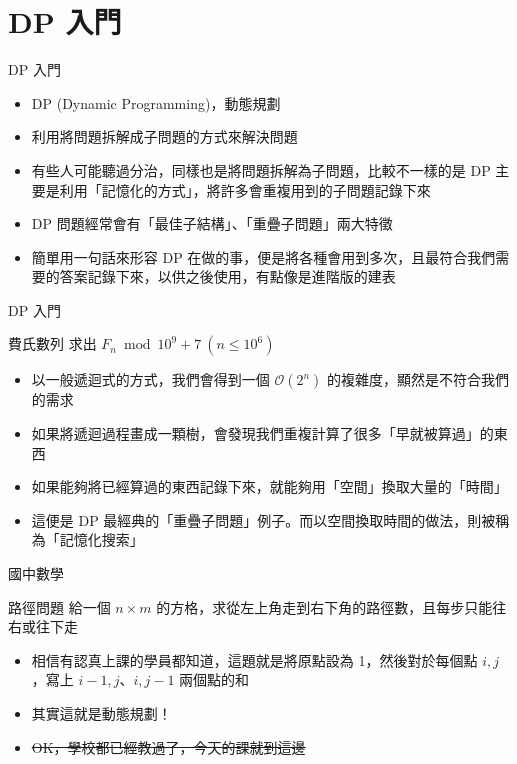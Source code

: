 \documentclass[aspectratio=169]{beamer}
\begin{document}
    \section{DP 入門}

    \begin{frame}{DP 入門}
        \begin{itemize}
            \item DP (Dynamic Programming)，動態規劃
            \item 利用將問題拆解成子問題的方式來解決問題
            \item 有些人可能聽過分治，同樣也是將問題拆解為子問題，比較不一樣的是 DP 主要是利用「記憶化的方式」，將許多會重複用到的子問題記錄下來
            \item DP 問題經常會有「最佳子結構」、「重疊子問題」兩大特徵
            \item 簡單用一句話來形容 DP 在做的事，便是將各種會用到多次，且最符合我們需要的答案記錄下來，以供之後使用，有點像是進階版的建表
        \end{itemize}
    \end{frame}

    \begin{frame}{DP 入門}
        \begin{block}{費氏數列}
            求出 $F_n \bmod 10^9 + 7\ (n \le 10^6)$
        \end{block}

        \begin{itemize}
            \item<1-> 以一般遞迴式的方式，我們會得到一個 $\mathcal{O}(2^n)$ 的複雜度，顯然是不符合我們的需求
            \item<2-> 如果將遞迴過程畫成一顆樹，會發現我們重複計算了很多「早就被算過」的東西
            \item<3-> 如果能夠將已經算過的東西記錄下來，就能夠用「空間」換取大量的「時間」
            \item<4-> 這便是 DP 最經典的「重疊子問題」例子。而以空間換取時間的做法，則被稱為「記憶化搜索」
        \end{itemize}
    \end{frame}

    \begin{frame}{國中數學}
        \begin{block}{路徑問題}
            給一個 $n \times m$ 的方格，求從左上角走到右下角的路徑數，且每步只能往右或往下走
        \end{block}

        \begin{itemize}
            \item<1-> 相信有認真上課的學員都知道，這題就是將原點設為 1，然後對於每個點 $i, j$，寫上 $i - 1, j$、$i, j - 1$ 兩個點的和
            \item<2-> 其實這就是動態規劃！
            \item<3-> \sout{OK，學校都已經教過了，今天的課就到這邊}
        \end{itemize}
    \end{frame}
\end{document}
